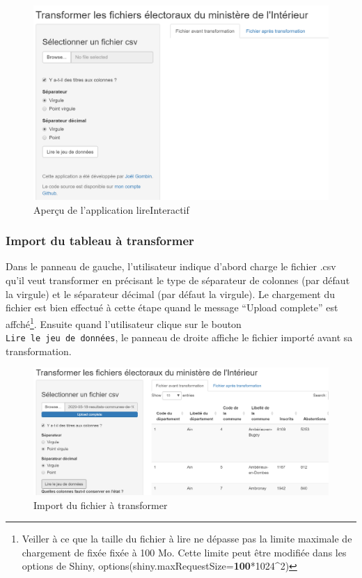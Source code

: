 \documentclass[
]{article}
\begin{document}
\begin{figure}

{\centering \includegraphics[width=0.75\linewidth]{fig/capture_lireInteractive} 

}

\caption{Aperçu de l'application lireInteractif}\label{fig:apercu_api}
\end{figure}

\hypertarget{import-du-tableau-uxe0-transformer}{%
\subsubsection{Import du tableau à
transformer}\label{import-du-tableau-uxe0-transformer}}

Dans le panneau de gauche, l'utilisateur indique d'abord charge le
fichier .csv qu'il veut transformer en précisant le type de séparateur
de colonnes (par défaut la virgule) et le séparateur décimal (par défaut
la virgule). Le chargement du fichier est bien effectué à cette étape
quand le message ``Upload complete'' est affché\footnote{Veiller à ce
  que la taille du fichier à lire ne dépasse pas la limite maximale de
  chargement de fixée fixée à 100 Mo. Cette limite peut être modifiée
  dans les options de Shiny,
  options(shiny.maxRequestSize=\textbf{100}*1024\^{}2)}. Ensuite quand
l'utilisateur clique sur le bouton \texttt{Lire\ le\ jeu\ de\ données},
le panneau de droite affiche le fichier importé avant sa transformation.

\begin{figure}

{\centering \includegraphics[width=0.75\linewidth]{fig/import_file_csv} 

}

\caption{Import du fichier à transformer}\label{fig:load_file}
\end{figure}
\end{document}
